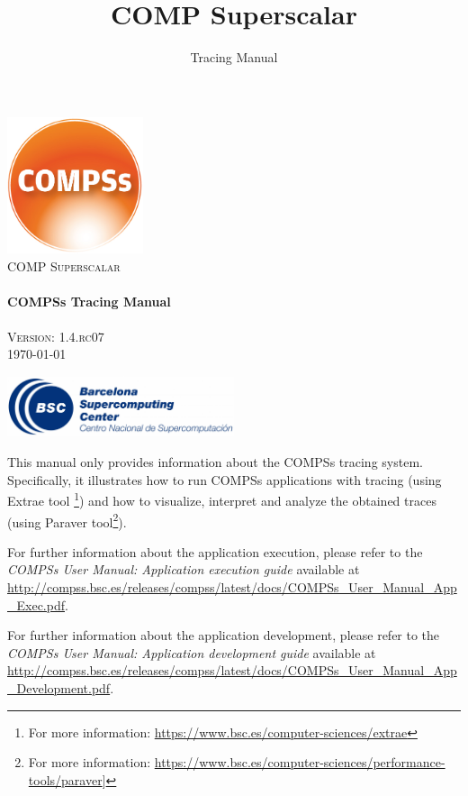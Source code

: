 \documentclass[a4paper,12pt]{article}
\title{COMP Superscalar}
\author{Tracing Manual}
\def \compssversion {1.4.rc07}
\begin{document}
  \hypersetup{pageanchor=false}
  \begin{titlepage} 
    \begin{center} 
      \includegraphics[width=0.3\textwidth]{./Figures/Logos/degradado-naranja-compss.jpg}~\\[1cm] 
      \textsc{\LARGE COMP Superscalar}\\[1.5cm] 
      
      \HRule \\[0.4cm] 
      { \huge \bfseries COMPSs Tracing Manual \\[0.4cm] }
      \HRule \\[1.5cm] 

      { \large \textsc{Version: \compssversion}} \\[0.3cm]
      { \large \today } 
      
      \vfill 
      \includegraphics[width=0.5\textwidth]{./Figures/bsc_280.jpg}~\\[1cm]
    \end{center} 
  \end{titlepage}
  \hypersetup{pageanchor=true}
  
  {
  
    This manual only provides information about the COMPSs tracing system. Specifically, it illustrates how to run COMPSs applications
    with tracing (using Extrae tool \footnote{For more information: \url{https://www.bsc.es/computer-sciences/extrae}}) and how to visualize, 
    interpret and analyze the obtained traces (using Paraver tool\footnote{For more information: \url{https://www.bsc.es/computer-sciences/performance-tools/paraver}]}).
    \newline

    For further information about the application execution, please refer to the \textit{COMPSs User Manual: Application execution
    guide} available at \url{http://compss.bsc.es/releases/compss/latest/docs/COMPSs_User_Manual_App_Exec.pdf}.
    
    For further information about the application development, please refer to the \textit{COMPSs User Manual: Application development
    guide} available at \url{http://compss.bsc.es/releases/compss/latest/docs/COMPSs_User_Manual_App_Development.pdf}.

  }
  
\end{document}
